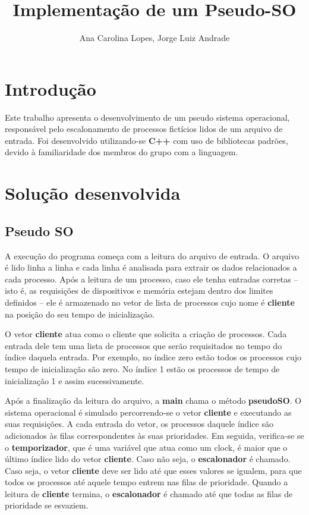 \documentclass[a4paper]{article}
\title{Implementação de um Pseudo-SO}
\author{Ana Carolina Lopes, Jorge Luiz Andrade}
\date{}
\begin{document}
\maketitle

\section{Introdução}
Este trabalho apresenta o desenvolvimento de um pseudo sistema operacional, responsável pelo escalonamento de processos fictícios lidos de um arquivo de entrada. Foi desenvolvido utilizando-se \textbf{C++} com uso de bibliotecas padrões, devido à familiaridade dos membros do grupo com a linguagem.

\section{Solução desenvolvida}
\subsection{Pseudo SO}
A execução do programa começa com a leitura do arquivo de entrada. O arquivo é lido linha a linha e cada linha é analisada para extrair os dados relacionados a cada processo. Após a leitura de um processo, caso ele tenha entradas corretas -- isto é, as requisições de dispositivos e memória estejam dentro dos limites definidos -- ele é armazenado no vetor de lista de processos cujo nome é \textbf{cliente} na posição do seu tempo de inicialização.

O vetor \textbf{cliente} atua como o cliente que solicita a criação de processos. Cada entrada dele tem uma lista de processos que serão requisitados no tempo do índice daquela entrada. Por exemplo, no índice zero estão todos os processos cujo tempo de inicialização são zero. No índice 1 estão os processos de tempo de inicialização 1 e assim sucessivamente.

Após a finalização da leitura do arquivo, a \textbf{main} chama o método \textbf{pseudoSO}.
O sistema operacional é simulado percorrendo-se o vetor \textbf{cliente} e executando as suas requisições. A cada entrada do vetor, os processos daquele índice são adicionados às filas correspondentes às suas prioridades. 
Em seguida, verifica-se se o \textbf{temporizador}, que é uma variável que atua como um clock, é maior que o último índice lido do vetor \textbf{cliente}. Caso não seja, o \textbf{escalonador} é chamado. Caso seja, o vetor \textbf{cliente} deve ser lido até que esses valores se igualem, para que todos os processos até aquele tempo entrem nas filas de prioridade. Quando a leitura de \textbf{cliente} termina, o \textbf{escalonador} é chamado até que todas as filas de prioridade se esvaziem.
\end{document}
